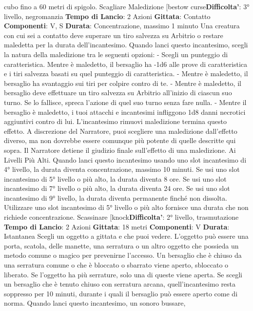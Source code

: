 \begin{multicols}{2}
cubo fino a 60 metri di spigolo.
Scagliare Maledizione
[bestow curse\textbf{Difficolta'}:
3° livello, negromanzia
\textbf{Tempo di Lancio}: 2 Azioni
\textbf{Gittata}: Contatto
\textbf{Componenti}: V, S
\textbf{Durata}: Concentrazione, massimo 1 minuto
Una creatura con cui sei a contatto deve superare un
tiro salvezza su Arbitrio o restare maledetta per la
durata dell’incantesimo. Quando lanci questo
incantesimo, scegli la natura della maledizione tra le
seguenti opzioni:
- Scegli un punteggio di caratteristica. Mentre è
maledetto, il bersaglio ha -1d6 alle prove di
caratteristica e i tiri salvezza basati su quel
punteggio di caratteristica.
- Mentre è maledetto, il bersaglio ha svantaggio sui
tiri per colpire contro di te.
- Mentre è maledetto, il bersaglio deve effettuare un
tiro salvezza su Arbitrio all’inizio di ciascun suo
turno. Se lo fallisce, spreca l’azione di quel suo
turno senza fare nulla.
- Mentre il bersaglio è maledetto, i tuoi attacchi e
incantesimi infliggono 1d8 danni necrotici aggiuntivi
contro di lui.
L’incantesimo rimuovi maledizione termina questo
effetto. A discrezione del Narratore, puoi scegliere una
maledizione dall’effetto diverso, ma non dovrebbe
essere comunque più potente di quelle descritte qui
sopra. Il Narratore detiene il giudizio finale sull’effetto di una
maledizione.
Ai Livelli Più Alti. Quando lanci questo incantesimo
usando uno slot incantesimo di 4° livello, la durata
diventa concentrazione, massimo 10 minuti. Se usi uno
slot incantesimo di 5° livello o più alto, la durata diventa
8 ore. Se usi uno slot incantesimo di 7° livello o più alto,
la durata diventa 24 ore. Se usi uno slot incantesimo di
9° livello, la durata diventa permanente finché non
dissolta. Utilizzare uno slot incantesimo di 5° livello o
più alto fornisce una durata che non richiede
concentrazione.
Scassinare
[knock\textbf{Difficolta'}:
2° livello, trasmutazione
\textbf{Tempo di Lancio}: 2 Azioni
\textbf{Gittata}: 18 metri
\textbf{Componenti}: V
\textbf{Durata}: Istantanea
Scegli un oggetto a gittata e che puoi vedere. L’oggetto
può essere una porta, scatola, delle manette, una
serratura o un altro oggetto che possieda un metodo
comune o magico per prevenirne l’accesso.
Un bersaglio che è chiuso da una serratura comune o
che è bloccato o sbarrato viene aperto, sbloccato o
liberato. Se l’oggetto ha più serrature, solo una di
queste viene aperta.
Se scegli un bersaglio che è tenuto chiuso con
serratura arcana, quell’incantesimo resta soppresso per
10 minuti, durante i quali il bersaglio può essere aperto
come di norma.
Quando lanci questo incantesimo, un sonoro bussare,

\end{multicols}
